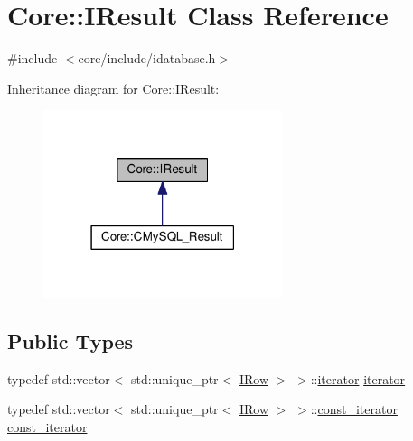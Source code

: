 \hypertarget{classCore_1_1IResult}{}\section{Core\+:\+:I\+Result Class Reference}
\label{classCore_1_1IResult}


{\ttfamily \#include $<$core/include/idatabase.\+h$>$}



Inheritance diagram for Core\+:\+:I\+Result\+:\nopagebreak
\begin{figure}[H]
\begin{center}
\leavevmode
\includegraphics[width=198pt]{classCore_1_1IResult__inherit__graph}
\end{center}
\end{figure}
\subsection*{Public Types}
\begin{DoxyCompactItemize}
\item 
typedef std\+::vector$<$ std\+::unique\+\_\+ptr$<$ \hyperlink{classCore_1_1IRow}{I\+Row} $>$ $>$\+::\hyperlink{classCore_1_1IResult_a1b8d24ea97ebbe669bb13c09ad5ad796}{iterator} \hyperlink{classCore_1_1IResult_a1b8d24ea97ebbe669bb13c09ad5ad796}{iterator}
\item 
typedef std\+::vector$<$ std\+::unique\+\_\+ptr$<$ \hyperlink{classCore_1_1IRow}{I\+Row} $>$ $>$\+::\hyperlink{classCore_1_1IResult_a4f549868ef8d40c199565efd7b89f45c}{const\+\_\+iterator} \hyperlink{classCore_1_1IResult_a4f549868ef8d40c199565efd7b89f45c}{const\+\_\+iterator}
\end{DoxyCompactItemize}

